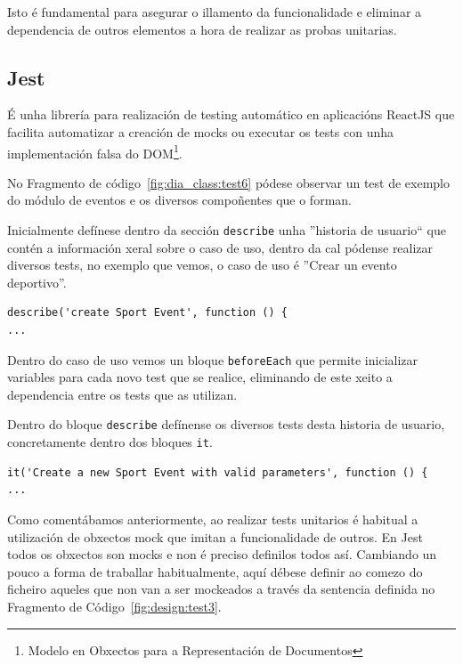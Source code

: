       Isto é fundamental para asegurar o illamento da funcionalidade e eliminar 
a dependencia de outros elementos a hora de realizar as probas unitarias.

    \subsection{Jest}
    É unha librería para realización de testing automático en aplicacións 
ReactJS que facilita automatizar a creación de mocks ou executar os tests con 
unha implementación falsa do DOM\footnote{Modelo en Obxectos para a 
Representación de Documentos}.

    No Fragmento de código~\ref{fig:dia_class:test6} pódese observar un test 
de exemplo do módulo de eventos e os diversos compoñentes que o forman. 

    Inicialmente defínese dentro da sección \lstinline{describe} unha 
''historia de usuario`` que contén a información xeral sobre o caso de uso, 
dentro da cal pódense realizar diversos tests, no exemplo que vemos, o caso de 
uso é ''Crear un evento deportivo''.

    \lstset{}
    \begin{lstlisting}[caption=Definición de unha historia de usuario en Jest., 
label=fig:design:test1]
describe('create Sport Event', function () {
...
    \end{lstlisting}

    Dentro do caso de uso vemos un bloque \lstinline{beforeEach} que permite 
inicializar variables para cada novo test que se realice, eliminando de este 
xeito a dependencia entre os tests que as utilizan.

    Dentro do bloque \lstinline{describe} defínense os diversos tests desta 
historia de usuario, concretamente dentro dos bloques \lstinline{it}.

    \lstset{}
    \begin{lstlisting}[caption=Definición de un test en Jest., 
label=fig:design:test2]
it('Create a new Sport Event with valid parameters', function () {
...
    \end{lstlisting}

    Como comentábamos anteriormente, ao realizar tests unitarios é habitual a 
utilización de obxectos mock que imitan a funcionalidade de outros.
    En Jest todos os obxectos son mocks e non é preciso definilos todos así.
Cambiando un pouco a forma de traballar habitualmente, aquí débese definir ao 
comezo do ficheiro aqueles que non van a ser mockeados a través da sentencia 
definida no Fragmento de Código~\ref{fig:design:test3}.

